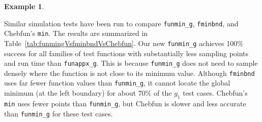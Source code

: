 \documentclass[review]{elsarticle}
\newcommand{\abstol}{\varepsilon}
\theoremstyle{definition}
\newtheorem{exmp}{Example}
\newcommand{\funappxg}{\texttt{funappx\_g}\xspace}
\newcommand{\funming}{\texttt{funmin\_g}\xspace}
\newcommand{\fminbnd}{\texttt{fminbnd}\xspace}
\newcommand{\integralg}{\texttt{integral\_g}\xspace}
\begin{document}
\begin{exmp}
\begin{table}[tb]
{	}
\end{table}
%

Similar simulation tests have been run to compare \funming, \fminbnd, and
Chebfun's \texttt{min}.  The results are summarized in
Table~\ref{tab:funmingVsfminbndVsChebfun}. Our new \funming{} achieves 100\% success
for all families of test functions with substantially less sampling points and run time than
\funappxg. This is because \funming does not need to sample densely where the function is not close to its minimum value.  Although \fminbnd uses far fewer function values than \funming, it cannot locate the global minimum (at the
left boundary) for about 70\% of the $g_1$ test cases.
Chebfun's {\tt min} uses fewer points than \funming, but Chebfun is slower and less accurate than \funming for these test cases.

\end{exmp}


\begin{comment}
\begin{exmp}
In this example, we consider the function $f_4(x) = sin(10 \pi x^4) + x$, which
is increasing oscillating over the interval $[0,2]$. We use \funappxg, \funming,
and \integralg to approximate the function, locate its global minimum, and
estimate its integral with $\abstol = 10^{-8}$. With $1,972,359$ points,
\funappxg can approximate $f_4$ uniformly accurate as shown in
Figure~\ref{f4fig}(a). The true global minimum is $(0.6212340312,
-0.3782149854)$ and the absolute approximation error of \funming using
$n=2,022,621$ points is $(1.4\times 10^{-7}, 4.7\times 10^{-11})$. The integral
$\int_{0}^{2} f_4 (x) dx = 2.145517314$ and the approximation error of
\integralg is $4.7\times10^{-10}$ using $4,965,641$ points.

\begin{figure}[bt]
\centering
\texttt{[image: figure/f4\_funappx\_error.eps]} \hspace{-5ex}
\texttt{[image: figure/f4\_funmin\_g.eps]}
\caption{The example $f_4$ with errors of interpolants from \funappxg (left) and
minimum found by \funming (right).}
\label{f4fig}
\end{figure}
\end{exmp}
\end{comment}


\begin{comment}
Our algorithm is readily extensible to the following complex-valued function.
\begin{exmp}
This example is taken from MATLAB's documentation for \texttt{interp1}. Define
the complex valued function $v(x) = 5x + x^2 i$ for $x \in [1,10]$. It is clear
that the real part of $v$ is $5x$ and the imaginary part is $x^2$. We could
apply \funappxg to approximate the two parts separately. However, it is
unnecessary.
\end{exmp}
\end{comment}
\end{document}
